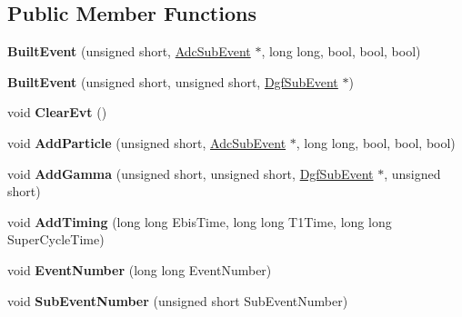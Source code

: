 \subsection*{Public Member Functions}
\begin{DoxyCompactItemize}
\item 
\hypertarget{class_built_event_a6191c8fda84fcc3ab2ce774db393db18}{{\bfseries Built\-Event} (unsigned short, \hyperlink{class_adc_sub_event}{Adc\-Sub\-Event} $\ast$, long long, bool, bool, bool)}\label{class_built_event_a6191c8fda84fcc3ab2ce774db393db18}

\item 
\hypertarget{class_built_event_ae9580318d1344acfc33d4e603d31f058}{{\bfseries Built\-Event} (unsigned short, unsigned short, \hyperlink{class_dgf_sub_event}{Dgf\-Sub\-Event} $\ast$)}\label{class_built_event_ae9580318d1344acfc33d4e603d31f058}

\item 
\hypertarget{class_built_event_a332515d3db4d4e0b324a4584090d78e3}{void {\bfseries Clear\-Evt} ()}\label{class_built_event_a332515d3db4d4e0b324a4584090d78e3}

\item 
\hypertarget{class_built_event_a3f521359cd9e884f3eaba119ef8f6102}{void {\bfseries Add\-Particle} (unsigned short, \hyperlink{class_adc_sub_event}{Adc\-Sub\-Event} $\ast$, long long, bool, bool, bool)}\label{class_built_event_a3f521359cd9e884f3eaba119ef8f6102}

\item 
\hypertarget{class_built_event_ae7e96358bcd4b95f4908ed0eff1be292}{void {\bfseries Add\-Gamma} (unsigned short, unsigned short, \hyperlink{class_dgf_sub_event}{Dgf\-Sub\-Event} $\ast$, unsigned short)}\label{class_built_event_ae7e96358bcd4b95f4908ed0eff1be292}

\item 
\hypertarget{class_built_event_a4c1868b1cd5d9e2e143db1feebe51b40}{void {\bfseries Add\-Timing} (long long Ebis\-Time, long long T1\-Time, long long Super\-Cycle\-Time)}\label{class_built_event_a4c1868b1cd5d9e2e143db1feebe51b40}

\item 
\hypertarget{class_built_event_ad3dfcf9a541516c8c9bc391ca91e8748}{void {\bfseries Event\-Number} (long long Event\-Number)}\label{class_built_event_ad3dfcf9a541516c8c9bc391ca91e8748}

\item 
\hypertarget{class_built_event_a71a6879f3cb5a2d2714c17152c569c41}{void {\bfseries Sub\-Event\-Number} (unsigned short Sub\-Event\-Number)}\label{class_built_event_a71a6879f3cb5a2d2714c17152c569c41}


\end{DoxyCompactItemize}
